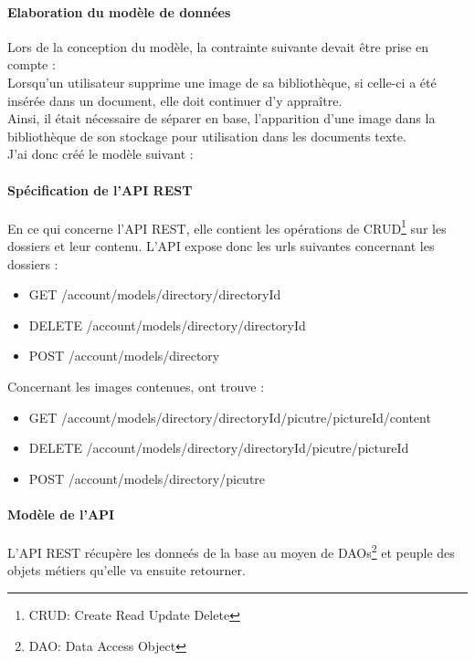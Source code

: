 \paragraph*{Elaboration du modèle de données}
Lors de la conception du modèle, la contrainte suivante devait être prise en compte : \\
Lorsqu'un utilisateur supprime une image de sa bibliothèque, si celle-ci a été insérée dans un document, elle doit continuer d'y appraître. \\
Ainsi, il était nécessaire de séparer en base, l'apparition d'une image dans la bibliothèque de son stockage pour utilisation dans les documents texte. \\
J'ai donc créé le modèle suivant : 


\paragraph*{Spécification de l'API REST}
En ce qui concerne l'API REST, elle contient les opérations de CRUD\footnote{CRUD: Create Read Update Delete} sur les dossiers et leur contenu.
L'API expose donc les urls suivantes concernant les dossiers : 
\begin{itemize}
\item GET /account/models/directory/{directoryId}
\item DELETE /account/models/directory/{directoryId}
\item POST /account/models/directory
\end{itemize}

Concernant les images contenues, ont trouve :
\begin{itemize}
\item GET /account/models/directory/{directoryId}/picutre/{pictureId}/content
\item DELETE /account/models/directory/{directoryId}/picutre/{pictureId}
\item POST /account/models/directory/picutre
\end{itemize}

\paragraph*{Modèle de l'API}
L'API REST récupère les donneés de la base au moyen de DAOs\footnote{DAO: Data Access Object} et peuple des objets métiers qu'elle va ensuite retourner.\\


